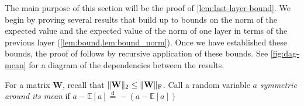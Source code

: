 \documentclass[twoside]{article}
\renewcommand{\ss}[1]{_{\text{#1}}}
\newcommand{\mW}{\mathbf{W}}
\newcommand{\E}{\mathbb{E}}
\newcommand{\disteq}{\overset{\text{d}}{=}}
\renewcommand{\ss}[1]{_{\text{#1}}}        %
\DeclarePairedDelimiter\norm{\|}{\|}             %
\theoremstyle{theoremstyle}
\begin{document}
The main purpose of this section will be the proof of \cref{lem:last-layer-bound}. We begin by proving several results that build up to bounds on the norm of the expected value and the expected value of the norm of one layer in terms of the previous layer (\cref{lem:bound,lem:bound_norm}). Once we have established these bounds, the proof of  follows by recursive application of these bounds. See \cref{fig:dag-mean} for a diagram of the dependencies between the results. %

For a matrix $\mW$, recall that $\norm{\mW}_2 \le \norm{\mW}\ss{F}$.
Call a random variable $a$ \emph{symmetric around its mean} if $a - \E[a] \disteq -(a - \E[a])$
\end{document}
